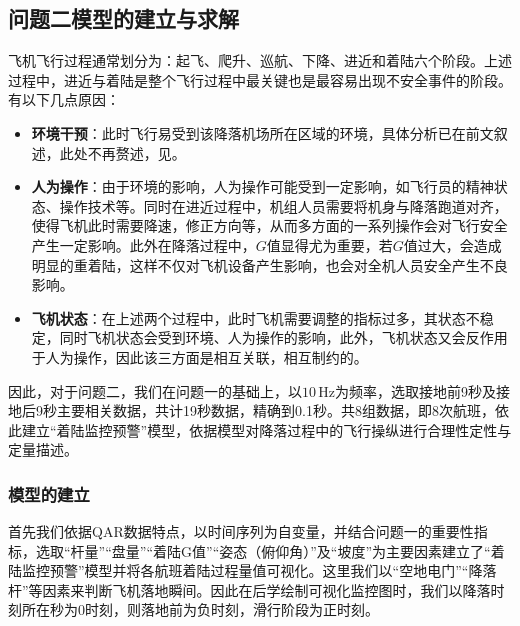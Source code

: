 \documentclass{MathorCupModeling}
\begin{document}
	\subsection{问题二模型的建立与求解}
	飞机飞行过程通常划分为：起飞、爬升、巡航、下降、进近和着陆六个阶段\textcolor{blue}{\cite{Paper:郑薇}}。上述过程中，进近与着陆是整个飞行过程中最关键也是最容易出现不安全事件的阶段。有以下几点原因：
	\begin{itemize}
		\item \textbf{环境干预}：此时飞行易受到该降落机场所在区域的环境，具体分析已在前文叙述，此处不再赘述，见\textcolor{blue}{}。
		\item \textbf{人为操作}：由于环境的影响，人为操作可能受到一定影响，如飞行员的精神状态、操作技术等。同时在进近过程中，机组人员需要将机身与降落跑道对齐，使得飞机此时需要降速，修正方向等，从而多方面的一系列操作会对飞行安全产生一定影响。此外在降落过程中，$G$值显得尤为重要，若$G$值过大，会造成明显的重着陆，这样不仅对飞机设备产生影响，也会对全机人员安全产生不良影响。
		\item \textbf{飞机状态}：在上述两个过程中，此时飞机需要调整的指标过多，其状态不稳定，同时飞机状态会受到环境、人为操作的影响，此外，飞机状态又会反作用于人为操作，因此该三方面是相互关联，相互制约的。
	\end{itemize}
	
	因此，对于问题二，我们在问题一的基础上，以$10\,\text{Hz}$为频率，选取接地前9秒及接地后9秒主要相关数据，共计19秒数据，精确到0.1秒。共8组数据，即8次航班，依此建立“着陆监控预警”模型，依据模型对降落过程中的飞行操纵进行合理性定性与定量描述。
	\subsubsection{模型的建立}
	首先我们依据QAR数据特点，以时间序列为自变量，并结合问题一的重要性指标，选取“杆量”“盘量”“着陆G值”“姿态（俯仰角）”及“坡度”为主要因素建立了“着陆监控预警”模型并将各航班着陆过程量值可视化。这里我们以“空地电门”“降落杆”等因素来判断飞机落地瞬间。因此在后学绘制可视化监控图时，我们以降落时刻所在秒为$0$时刻，则落地前为负时刻，滑行阶段为正时刻。
\end{document}
